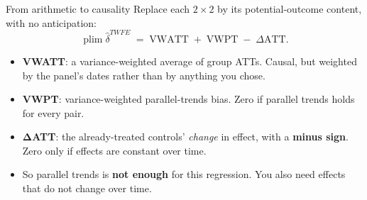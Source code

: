 \documentclass[
  11pt,
  ignorenonframetext,
  aspectratio=169,
]{beamer}
\providecommand{\tightlist}{%
  \setlength{\itemsep}{0pt}\setlength{\parskip}{0pt}}
\begin{document}
\begin{frame}{From arithmetic to causality}
\protect{}\label{from-arithmetic-to-causality}
Replace each \(2 \times 2\) by its potential-outcome content, with no
anticipation: \[
\operatorname{plim}\hat\delta^{TWFE} \;=\; \text{VWATT} \;+\; \text{VWPT} \;-\; \Delta\text{ATT}.
\]

\begin{itemize}
\tightlist
\item
  \textbf{VWATT}: a variance-weighted average of group ATTs. Causal, but
  weighted by the panel's dates rather than by anything you chose.
\item
  \textbf{VWPT}: variance-weighted parallel-trends bias. Zero if
  parallel trends holds for every pair.
\item
  \(\boldsymbol{\Delta}\)\textbf{ATT}: the already-treated controls'
  \emph{change} in effect, with a \textbf{minus sign}. Zero only if
  effects are constant over time.
\end{itemize}

\vspace{0.3em}

\begin{itemize}
\tightlist
\item
  So parallel trends is \textbf{not enough} for this regression. You
  also need effects that do not change over time.
\end{itemize}
\end{frame}
\end{document}
